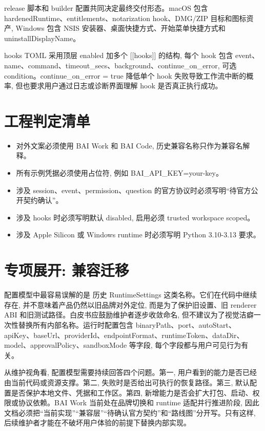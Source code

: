 release 脚本和 builder 配置共同决定最终交付形态。macOS 包含 hardenedRuntime、entitlements、notarization hook、DMG/ZIP 目标和图标资产, Windows 包含 NSIS 安装器、桌面快捷方式、开始菜单快捷方式和 uninstallDisplayName。

hooks TOML 采用顶层 enabled 加多个 [[hooks]] 的结构, 每个 hook 包含 event、name、command、timeout\_secs、background、continue\_on\_error, 可选 condition。continue\_on\_error = true 降低单个 hook 失败导致工作流中断的概率, 但也要求用户通过日志或诊断界面理解 hook 是否真正执行成功。

\section{工程判定清单}
\begin{itemize}
  \item 对外文案必须使用 BAI Work 和 BAI Code, 历史兼容名称只作为兼容名解释。
  \item 所有示例凭据必须使用占位符, 例如 BAI\_API\_KEY=your-key。
  \item 涉及 session、event、permission、question 的官方协议时必须写明“待官方公开契约确认”。
  \item 涉及 hooks 时必须写明默认 disabled, 启用必须 trusted workspace scoped。
  \item 涉及 Apple Silicon 或 Windows runtime 时必须写明 Python 3.10-3.13 要求。
\end{itemize}

\section{专项展开: 兼容迁移}
配置模型中最容易误解的是 历史 RuntimeSettings 这类名称。它们在代码中继续存在, 并不意味着产品仍然以旧品牌对外定位, 而是为了保护旧设置、旧 renderer ABI 和旧测试路径。白皮书应鼓励维护者逐步收敛命名, 但不建议为了视觉洁癖一次性替换所有内部名称。运行时配置包含 binaryPath、port、autoStart、apiKey、baseUrl、providerId、endpointFormat、runtimeToken、dataDir、model、approvalPolicy、sandboxMode 等字段, 每个字段都与用户可见行为有关。

从维护视角看, 配置模型需要持续回答四个问题。第一, 用户看到的能力是否已经由当前代码或资源支撑。第二, 失败时是否给出可执行的恢复路径。第三, 默认配置是否保护本地文件、凭据和工作区。第四, 新增能力是否会扩大打包、启动、权限或协议依赖。BAI Work 当前处在品牌切换和 runtime 适配并行推进阶段, 因此文档必须把“当前实现”“兼容层”“待确认官方契约”和“路线图”分开写。只有这样, 后续维护者才能在不破坏用户体验的前提下替换内部实现。

